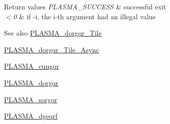 \begin{DoxyRetVals}{Return values}
{\em P\+L\+A\+S\+M\+A\+\_\+\+S\+U\+C\+C\+E\+S\+S} & successful exit \\
\hline
{\em $<$0} & if -\/i, the i-\/th argument had an illegal value\\
\hline
\end{DoxyRetVals}
\begin{DoxySeeAlso}{See also}
\hyperlink{group__double__Tile_gae246f76afc3683dcb4fd74c72da5791e_gae246f76afc3683dcb4fd74c72da5791e}{P\+L\+A\+S\+M\+A\+\_\+dorgqr\+\_\+\+Tile} 

\hyperlink{group__double__Tile__Async_gaab79417822b069ee12f434beaec61420_gaab79417822b069ee12f434beaec61420}{P\+L\+A\+S\+M\+A\+\_\+dorgqr\+\_\+\+Tile\+\_\+\+Async} 

\hyperlink{group__PLASMA__Complex32__t_ga6c696165c8c276260ba80eff16e4d291_ga6c696165c8c276260ba80eff16e4d291}{P\+L\+A\+S\+M\+A\+\_\+cungqr} 

\hyperlink{group__double_ga5137c6e07ebf2faddae220daa28999ba_ga5137c6e07ebf2faddae220daa28999ba}{P\+L\+A\+S\+M\+A\+\_\+dorgqr} 

\hyperlink{group__float_ga4b6a6aa9e5da7961424f3afb62a69562_ga4b6a6aa9e5da7961424f3afb62a69562}{P\+L\+A\+S\+M\+A\+\_\+sorgqr} 

\hyperlink{group__double_gaad8136b3520b4bda7261d3f921c8a740_gaad8136b3520b4bda7261d3f921c8a740}{P\+L\+A\+S\+M\+A\+\_\+dgeqrf} 
\end{DoxySeeAlso}
\hypertarget{group__double_ga7c70d5b53e69f9ab564126c78938002a_ga7c70d5b53e69f9ab564126c78938002a}{}
